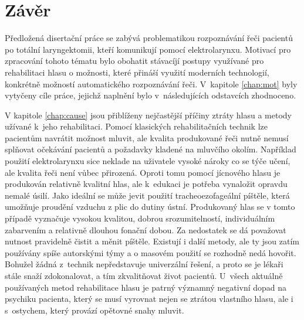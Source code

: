 \ifdefined\CELE
\else

\fi

\chapter*{Závěr}
\label{chap:conclusion}

Předložená disertační práce se zabývá problematikou rozpoznávání řeči pacientů po totální laryngektomii, kteří komunikují pomocí elektrolarynxu. Motivací pro zpracování tohoto tématu bylo obohatit stávacíjí postupy využívané pro rehabilitaci hlasu o možnosti, které přináší využití moderních technologií, konkrétně možností automatického rozpoznávání řeči. V~kapitole \ref{chap:mot} byly vytyčeny cíle práce, jejichž naplnění bylo v~následujících odstavcích zhodnoceno.

V kapitole \ref{chap:cause} jsou přiblíženy nejčastější příčiny ztráty hlasu a metody užívané k~jeho rehabilitaci.
Pomocí klasických rehabilitačních technik lze pacientům navrátit možnost mluvit, ale kvalita produkované řeči nutně nemusí splňovat očekávání pacientů  a požadavky kladené na mluvčího okolím. Například použití
elektrolarynxu sice neklade na uživatele vysoké nároky co se týče učení, ale
kvalita řeči není vůbec přirozená. Oproti tomu pomocí jícnového hlasu je
produkován relativně kvalitní hlas, ale k~edukaci je potřeba vynaložit opravdu
nemalé úsilí. Jako ideální se může jevit použití tracheoezofageální píštěle,
která umožňuje proudění vzduchu z plic do dutiny ústní. Produkovaný hlas se v
tomto případě vyznačuje vysokou kvalitou, dobrou srozumitelností,
individuálním zabarvením a relativně dlouhou fonační dobou. Za nedostatek se
dá považovat nutnost pravidelně čistit a měnit píštěle. Existují i další
metody,
ale ty jsou zatím používány
spíše autorskými týmy a o masovém použití se rozhodně nedá hovořit. Bohužel
žádná z~technik nepředstavuje univerzální řešení, a proto se je lékaři
stále snaží zdokonalovat, a tím zkvalitňovat život pacientů. U~všech aktuálně používaných metod rehabilitace hlasu
je patrný významný negativní dopad na psychiku pacienta, který se musí vyrovnat nejen se ztrátou vlastního hlasu, ale i s~ostychem, který provází opětovné snahy mluvit.

